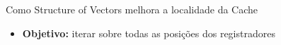 \begin{frame}{Como Structure of Vectors melhora a localidade da Cache}
    \begin{itemize}
        \item[] \textbf{Objetivo:} iterar sobre todas as posições dos registradores
    \end{itemize}

    \begin{center}
    \end{center}
    
\end{frame}
